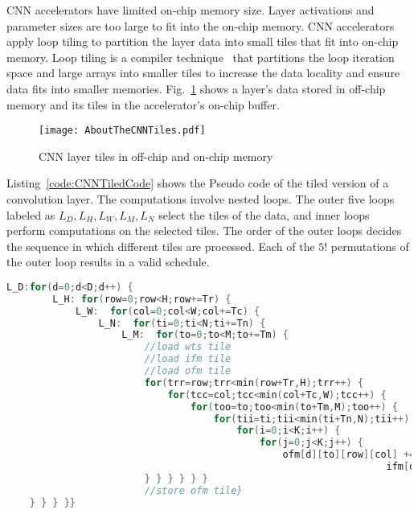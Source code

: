CNN accelerators have limited on-chip memory size. Layer activations and parameter sizes are too large to fit into the on-chip memory. CNN accelerators apply loop tiling to partition the layer data into small tiles that fit into on-chip memory. Loop tiling is a compiler  technique~\cite{aho2006compilers} that partitions the loop iteration space and large arrays into smaller tiles to increase the data locality and ensure data fits into smaller memories. Fig.~\ref{fig:partitioningDataUsingTiling} shows a layer's data stored in off-chip memory and its tiles in the accelerator's on-chip buffer.
\begin{figure}[!htb]
	\centering
	\captionsetup{font=sf}	
	\texttt{[image: AboutTheCNNTiles.pdf]}
	\caption{CNN layer tiles in off-chip and on-chip memory}
	\label{fig:partitioningDataUsingTiling}
\end{figure}

Listing~\ref{code:CNNTiledCode} shows the Pseudo code of the tiled version of a convolution layer. The computations involve nested loops. The outer five loops labeled as $L_D,L_H,L_W,L_M,L_N$ select the tiles of the data, and inner loops perform computations on the selected tiles. The order of the outer loops decides the sequence in which different tiles are processed. Each of the $5!$ permutations of the outer loop results in a valid schedule. 
\begin{lstlisting}[float,language=C,label=code:CNNTiledCode,caption=Pseudo code of a tiled convolution layer,captionpos=b,belowskip=-1 \baselineskip,breakautoindent=true, breakindent=108pt, breaklines]
	L_D:for(d=0;d<D;d++) {
		L_H: for(row=0;row<H;row+=Tr) {
			L_W:  for(col=0;col<W;col+=Tc) {
				L_N:  for(ti=0;ti<N;ti+=Tn) {
					L_M:  for(to=0;to<M;to+=Tm) {
						//load wts tile
						//load ifm tile
						//load ofm tile
						for(trr=row;trr<min(row+Tr,H);trr++) {
							for(tcc=col;tcc<min(col+Tc,W);tcc++) {
								for(too=to;too<min(to+Tm,M);too++) {
									for(tii=ti;tii<min(ti+Tn,N);tii++) {
										for(i=0;i<K;i++) {
											for(j=0;j<K;j++) {
												ofm[d][to][row][col] += weights[to][ti][i][j] * 
												                  ifm[d][ti][S*row+i][S*col+j];
						} } } } } }
						//store ofm tile}
	} } } }}
\end{lstlisting}

